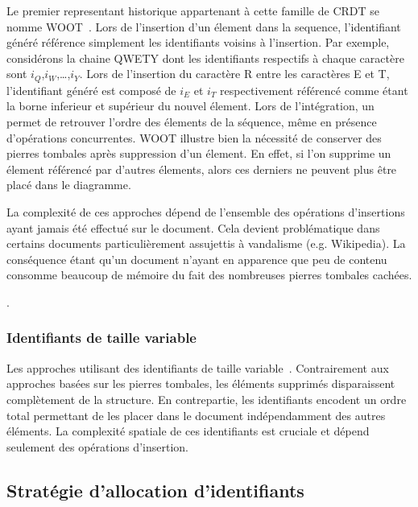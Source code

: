 Le premier representant historique appartenant à cette famille de CRDT se nomme
WOOT~\cite{oster2006data}. Lors de l'insertion d'un élement dans la sequence,
l'identifiant généré référence simplement les identifiants voisins à
l'insertion. Par exemple, considérons la chaine QWETY dont les identifiants
respectifs à chaque caractère sont $i_Q$,$i_W$,\ldots,$i_Y$. Lors de l'insertion
du caractère R entre les caractères E et T, l'identifiant généré est composé de
$i_E$ et $i_T$ respectivement référencé comme étant la borne inferieur et
supérieur du nouvel élement. Lors de l'intégration, un 
permet de retrouver l'ordre des élements de la séquence, même en présence
d'opérations concurrentes. WOOT illustre bien la nécessité de conserver des
pierres tombales après suppression d'un élement. En effet, si l'on supprime un
élement référencé par d'autres élements, alors ces derniers ne peuvent plus être
placé dans le diagramme.

La complexité de ces approches dépend de l'ensemble des opérations d'insertions
ayant jamais été effectué sur le document. Cela devient problématique dans
certains documents particulièrement assujettis à vandalisme (e.g. Wikipedia). La
conséquence étant qu'un document n'ayant en apparence que peu de contenu
consomme beaucoup de mémoire du fait des nombreuses pierres tombales cachées.

.

\subsubsection{Identifiants de taille variable}

Les approches utilisant des identifiants de taille
variable~\cite{preguica2009commutative, andre2013supporting,
  weiss2009logoot}. Contrairement aux approches basées sur les pierres tombales,
les éléments supprimés disparaissent complètement de la structure. En
contrepartie, les identifiants encodent un ordre total permettant de les placer
dans le document indépendamment des autres éléments. La complexité spatiale de
ces identifiants est cruciale et dépend seulement des opérations d'insertion.

\subsection{Stratégie d'allocation d'identifiants}

